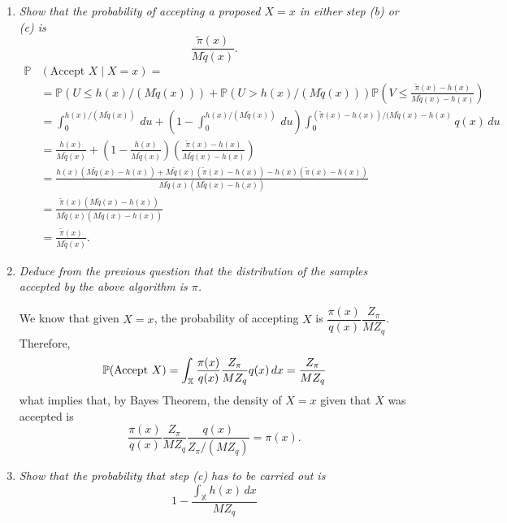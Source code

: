 \documentclass[a4paper,12pt]{article}
\newcommand{\pr}{\mathbb{P}}
\theoremstyle{definition}
\begin{document}
\begin{enumerate}
    \item {\it Show that the probability of accepting a proposed $X = x$ in either step (b) or (c) is}
    $$\frac{\tilde{\pi}(x)}{M\tilde{q}(x)}.$$
    \begin{equation*}
        \begin{split}
            \pr&(\text{Accept } X \mid X = x) = \\
            &= \pr(U \le h(x) / (M\tilde{q}(x))) 
            + \pr\left(U > h(x) / (M\tilde{q}(x))\right)\pr\left(V \le \frac{\tilde{\pi}(x) - h(x)}{M\tilde{q}(x) - h(x)}\right) \\
            &= \int_0^{h(x) / (M\tilde{q}(x))} \, du  + \left(1 - \int_0^{h(x) / (M\tilde{q}(x))} \, du\right)\int_0^{(\tilde{\pi}(x) - h(x)) / (M\tilde{q}(x) - h(x)} q(x) \, du \\ 
            &= \frac{h(x)}{M \tilde{q}(x)} + \left(1 - \frac{h(x)}{M \tilde{q}(x)}\right)\left(\frac{\tilde{\pi}(x) - h(x)}{M\tilde{q}(x) - h(x)}\right) \\
            &= \frac{h(x)(M\tilde{q}(x) - h(x)) + M\tilde{q}(x)(\tilde{\pi}(x) - h(x)) - h(x)(\tilde{\pi}(x) - h(x))}{M\tilde{q}(x)(M\tilde{q}(x) - h(x))}\\
            &= \frac{\tilde{\pi}(x)(M\tilde{q}(x) - h(x))}{M\tilde{q}(x)(M\tilde{q}(x) - h(x))} \\
            &= \frac{\tilde{\pi}(x)}{M\tilde{q}(x)}. 
        \end{split}
    \end{equation*}

    \item {\it Deduce from the previous question that the distribution of the
    samples accepted by the above algorithm is $\pi$.}

    We know that given $X = x$, the probability of accepting $X$ is
    $\dfrac{\pi(x)}{q(x)}\dfrac{Z_{\pi}}{MZ_q}$. Therefore, 
    $$
    \pr(\text{Accept } X) = \int_{\mathbb{X}} \dfrac{\pi(x)}{q(x)}\dfrac{Z_{\pi}}{MZ_q} q(x) \, dx \\
    = \frac{Z_{\pi}}{MZ_q} 
    $$
    what implies that, by Bayes Theorem, the density of $X = x$ given that $X$
   was accepted is 
    $$
    \frac{\pi(x)}{q(x)}\dfrac{Z_{\pi}}{MZ_q}\frac{q(x)}{Z_{\pi}/(MZ_q)} = \pi(x).
    $$

    \item {\it Show that the probability that step (c) has to be carried out is}
    $$
    1 - \frac{\int_{\mathbb{X}} h(x) \, dx}{MZ_q}
    $$


\end{enumerate}
\end{document}
